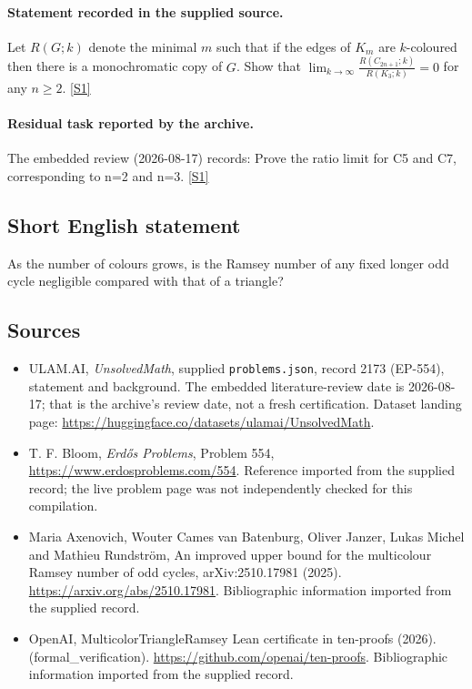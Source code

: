\documentclass[11pt,a4paper]{article}
\newcommand{\sref}[2]{\hyperlink{source:#1:#2}{[S#2]}}
\begin{document}
\paragraph{Statement recorded in the supplied source.}
Let $R(G;k)$ denote the minimal $m$ such that if the edges of $K_m$ are $k$-coloured then there is a monochromatic copy of $G$. Show that $ \lim_{k\to \infty}\frac{R(C_{2n+1};k)}{R(K_3;k)}=0 $ for any $n\geq 2$. \sref{2173}{1}

\paragraph{Residual task reported by the archive.}

The embedded review (2026-08-17) records: Prove the ratio limit for C5 and C7, corresponding to n=2 and n=3. \sref{2173}{1}

\subsection{Short English statement}

As the number of colours grows, is the Ramsey number of any fixed longer odd cycle negligible compared with that of a triangle?

\subsection{Sources}

{\small

\begin{itemize}

\item[\hypertarget{source:2173:1}{S1}] ULAM.AI, \emph{UnsolvedMath}, supplied \texttt{problems.json}, record 2173 (EP-554), statement and background. The embedded literature-review date is 2026-08-17; that is the archive’s review date, not a fresh certification. Dataset landing page: \url{https://huggingface.co/datasets/ulamai/UnsolvedMath}.

\item[\hypertarget{source:2173:2}{S2}] T. F. Bloom, \emph{Erdős Problems}, Problem 554, \url{https://www.erdosproblems.com/554}. Reference imported from the supplied record; the live problem page was not independently checked for this compilation.

\item[\hypertarget{source:2173:3}{S3}] Maria Axenovich, Wouter Cames van Batenburg, Oliver Janzer, Lukas Michel and Mathieu Rundström, An improved upper bound for the multicolour Ramsey number of odd cycles, arXiv:2510.17981 (2025). \url{https://arxiv.org/abs/2510.17981}. Bibliographic information imported from the supplied record.

\item[\hypertarget{source:2173:4}{S4}] OpenAI, MulticolorTriangleRamsey Lean certificate in ten-proofs (2026). (formal\_verification). \url{https://github.com/openai/ten-proofs}. Bibliographic information imported from the supplied record.

\end{itemize}

}

\label{end:2173}
\end{document}
